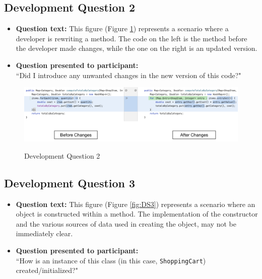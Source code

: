\subsection{Development Question 2}

\begin{itemize}
  \item[] \textbf{Question text:} This figure (Figure \ref{fig:DS2}) represents 
          a scenario where a developer is rewriting a method. The code on the 
          left is the method before the developer made changes, while the one 
          on the right is an updated version.
  \item[] \textbf{Question presented to participant:}  \\
         ``Did I introduce any unwanted changes in the new version of this 
           code?"
\end{itemize}

\begin{figure}[ht]
\centering
\caption{Development Question 2}
\includegraphics[width=\textwidth]{./figs/ds2.png}
\label{fig:DS2}
\end{figure}

\subsection{Development Question 3}

\begin{itemize}
  \item[] \textbf{Question text:} This figure (Figure \ref{fig:DS3}) represents 
          a scenario where an object is constructed within a method. The 
          implementation of the constructor and the various sources of data 
          used in creating the object, may not be immediately clear.
  \item[] \textbf{Question presented to participant:}  \\
          ``How is an instance of this class (in this case, 
           \texttt{ShoppingCart}) created/initialized?"
\end{itemize}

